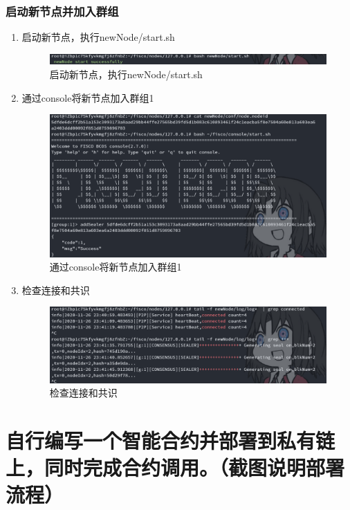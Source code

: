 \documentclass[a4paper, 11pt]{article}
\begin{document}
\subsubsection{启动新节点并加入群组}
\begin{enumerate}
      \item 启动新节点，执行newNode/start.sh
      \begin{figure}[H]
            \centering
            \includegraphics[width = 0.8 \textwidth]{startnewNode.png}
            \caption{启动新节点，执行newNode/start.sh}
      \end{figure}

      \item 通过console将新节点加入群组1
      \begin{figure}[H]
            \centering
            \includegraphics[width = 0.8 \textwidth]{addsealer.png}
            \caption{通过console将新节点加入群组1}
      \end{figure}

      \item 检查连接和共识
      \begin{figure}[H]
            \centering
            \includegraphics[width = 0.8 \textwidth]{checknewnode.png}
            \caption{检查连接和共识}
      \end{figure}
\end{enumerate}

\section{自行编写一个智能合约并部署到私有链上，同时完成合约调用。（截图说明部署流程）}
\end{document}

